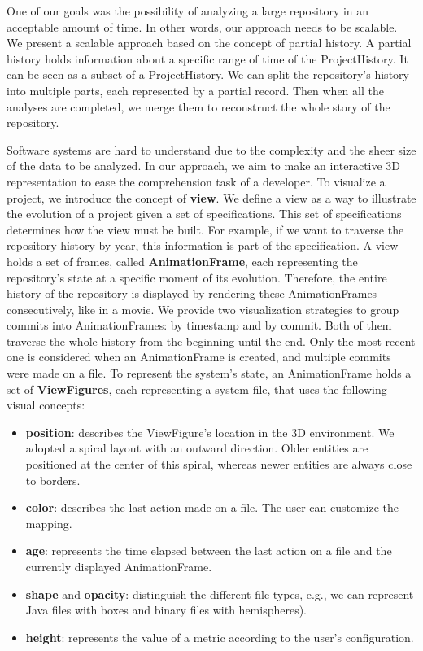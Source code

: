 \documentclass[11pt,twoside,english,singlespacing,headsepline,consistentlayout]{auxiliary/si-msc-thesis}
\begin{document}
One of our goals was the possibility of analyzing a large repository in an acceptable amount of time. 
In other words, our approach needs to be scalable. We present a scalable approach based on the concept of partial history.
A partial history holds information about a specific range of time of the ProjectHistory. 
It can be seen as a subset of a ProjectHistory. 
We can split the repository's history into multiple parts, each represented by a partial record. Then when all the analyses are completed, we merge them to reconstruct the whole story of the repository.

Software systems are hard to understand due to the complexity and the sheer size of the data to be analyzed.
In our approach, we aim to make an interactive 3D representation to ease the comprehension task of a developer. 
To visualize a project, we introduce the concept of \textbf{view}. We define a view as a way to illustrate the evolution of a project given a set of specifications. This set of specifications determines how the view must be built. For example, if we want to traverse the repository history by year, this information is part of the specification. A view holds a set of frames, called \textbf{AnimationFrame}, each representing the repository's state at a specific moment of its evolution. Therefore, the entire history of the repository is displayed by rendering these AnimationFrames consecutively, like in a movie. 
We provide two visualization strategies to group commits into AnimationFrames: by timestamp and by commit. Both of them traverse the whole history from the beginning until the end.
Only the most recent one is considered when an AnimationFrame is created, and multiple commits were made on a file. 
To represent the system's state, an AnimationFrame holds a set of \textbf{ViewFigures}, each representing a system file, that uses the following visual concepts: 
\begin{itemize}
	\item \textbf{position}: describes the ViewFigure's location in the 3D environment. We adopted a spiral layout with an outward direction. Older entities are positioned at the center of this spiral, whereas newer entities are always close to borders.
	\item \textbf{color}: describes the last action made on a file. The user can customize the mapping. 
	\item \textbf{age}: represents the time elapsed between the last action on a file and the currently displayed AnimationFrame.
	\item \textbf{shape} and \textbf{opacity}: distinguish the different file types, e.g., we can represent Java files with boxes and binary files with hemispheres). 
	\item \textbf{height}: represents the value of a metric according to the user's configuration. 
\end{itemize}
\end{document}
